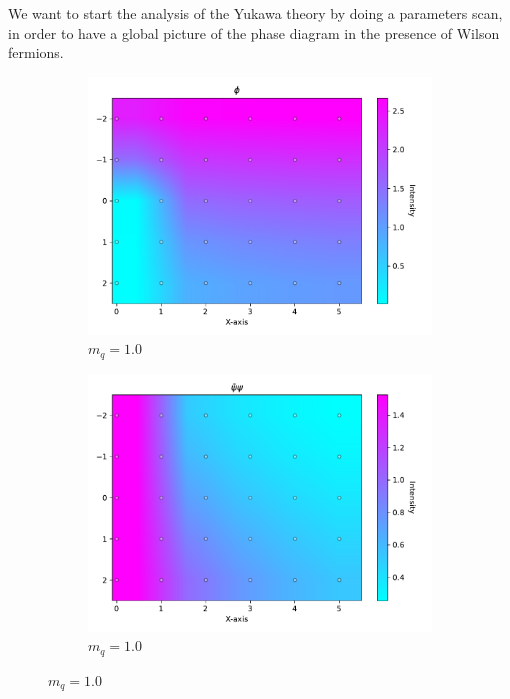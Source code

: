 We want to start the analysis of the Yukawa theory by doing a parameters scan, in order to have a global picture of the phase diagram in the presence of Wilson fermions.
\begin{figure}
    \centering
    \begin{subfigure}[b]{0.3\textwidth}
        \includegraphics[width=\textwidth]{figures/phase_diagram/m_g_phi.pdf}
        \caption{$m_q = 1.0$}
    \end{subfigure}
    \begin{subfigure}[b]{0.3\textwidth}
        \includegraphics[width=\textwidth]{figures/phase_diagram/m_g_cond.pdf}
        \caption{$m_q = 1.0$}
    \end{subfigure}

\end{figure}
